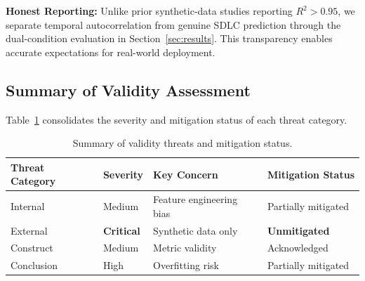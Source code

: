 \documentclass[technologies,article,submit,pdftex,moreauthors]{Definitions/mdpi}
\begin{document}
\textbf{Honest Reporting:} Unlike prior synthetic-data studies reporting
\(R^2 > 0.95\), we separate temporal autocorrelation from genuine SDLC
prediction through the dual-condition evaluation in
Section~\ref{sec:results}. This transparency enables
accurate expectations for real-world deployment.

\subsection{Summary of Validity Assessment}\label{sec:validity_summary}

Table~\ref{tab:validity} consolidates the severity and mitigation
status of each threat category.

{\def\LTcaptype{none} %
\begin{table}[H]
\centering
\caption{Summary of validity threats and mitigation status.\label{tab:validity}}
\begin{tabular}{@{}
  >{\raggedright\arraybackslash}p{}
  >{\raggedright\arraybackslash}p{}
  >{\raggedright\arraybackslash}p{}
  >{\raggedright\arraybackslash}p{}@{}}
\toprule
\begin{minipage}[b]{\linewidth}\raggedright
\textbf{Threat Category}
\end{minipage} & \begin{minipage}[b]{\linewidth}\raggedright
\textbf{Severity}
\end{minipage} & \begin{minipage}[b]{\linewidth}\raggedright
\textbf{Key Concern}
\end{minipage} & \begin{minipage}[b]{\linewidth}\raggedright
\textbf{Mitigation Status}
\end{minipage} \\
\midrule
Internal & Medium & Feature engineering bias & Partially mitigated \\
External & \textbf{Critical} & Synthetic data only &
\textbf{Unmitigated} \\
Construct & Medium & Metric validity & Acknowledged \\
Conclusion & High & Overfitting risk & Partially mitigated \\
\bottomrule
\end{tabular}
\end{table}
}
\end{document}
